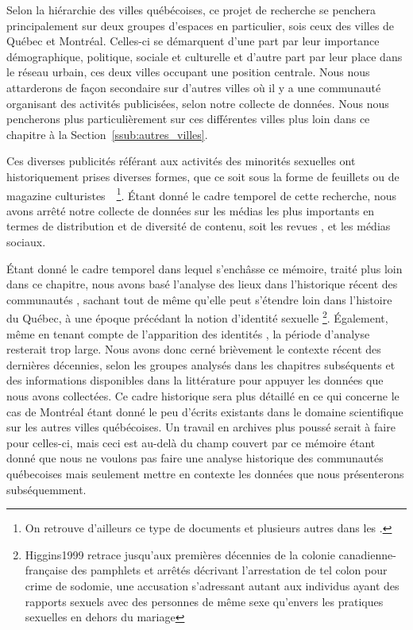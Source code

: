 Selon la hiérarchie des villes québécoises, ce projet de recherche se penchera principalement sur deux groupes d'espaces en particulier, sois ceux des villes de Québec et Montréal.
Celles-ci se démarquent d'une part par leur importance démographique, politique, sociale et culturelle et d'autre part par leur place dans le réseau urbain, ces deux villes occupant une position centrale.
Nous nous attarderons de façon secondaire sur d'autres villes où il y a une communauté \lgbt{} organisant des activités publicisées, selon notre collecte de données.
Nous nous pencherons plus particulièrement sur ces différentes villes plus loin dans ce chapitre à la Section~\ref{ssub:autres_villes}.

Ces diverses publicités référant aux activités des minorités sexuelles ont historiquement prises diverses formes, que ce soit sous la forme de feuillets ou de magazine culturistes~\citep{Higgins1999}~\footnote{On retrouve d'ailleurs ce type de documents et plusieurs autres dans les \agq{}.}.
Étant donné le cadre temporel de cette recherche, nous avons arrêté notre collecte de données sur les médias les plus importants en termes de distribution et de diversité de contenu, soit les revues \fugues{}, \sortie{} et les médias sociaux.

Étant donné le cadre temporel dans lequel s’enchâsse ce mémoire, traité plus loin dans ce chapitre, nous avons basé l'analyse des lieux dans l'historique récent des communautés \lgbt{}, sachant tout de même qu'elle peut s'étendre loin dans l'histoire du Québec, à une époque précédant la notion d'identité sexuelle \footnote{\citet{}{Higgins1999} retrace jusqu'aux premières décennies de la colonie canadienne-française des pamphlets et arrêtés décrivant l'arrestation de tel colon pour crime de sodomie, une accusation s'adressant autant aux individus ayant des rapports sexuels avec des personnes de même sexe qu'envers les pratiques sexuelles en dehors du mariage}.
Également, même en tenant compte de l'apparition des identités \lgbt{}, la période d'analyse resterait trop large.
Nous avons donc cerné brièvement le contexte récent des dernières décennies, selon les groupes analysés dans les chapitres subséquents et des informations disponibles dans la littérature pour appuyer les données que nous avons collectées.
Ce cadre historique sera plus détaillé en ce qui concerne le cas de Montréal étant donné le peu d'écrits existants dans le domaine scientifique sur les autres villes québécoises.
Un travail en archives plus poussé serait à faire pour celles-ci, mais ceci est au-delà du champ couvert par ce mémoire étant donné que nous ne voulons pas faire une analyse historique des communautés \lgbt{} québecoises mais seulement mettre en contexte les données que nous présenterons subséquemment.


